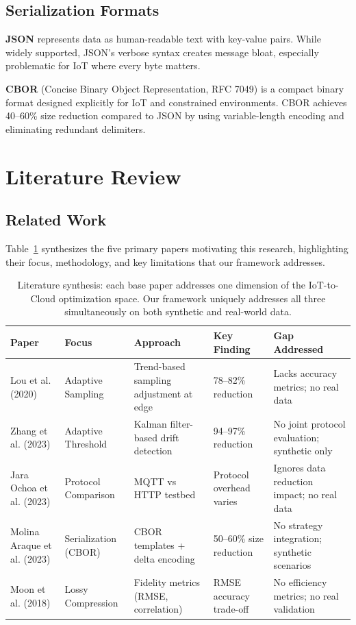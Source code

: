 \documentclass[10pt,twocolumn]{article}
\begin{document}
\subsection{Serialization Formats}

\textbf{JSON} represents data as human-readable text with key-value pairs. While widely supported, JSON's verbose syntax creates message bloat, especially problematic for IoT where every byte matters.

\textbf{CBOR} (Concise Binary Object Representation, RFC 7049) is a compact binary format designed explicitly for IoT and constrained environments. CBOR achieves 40--60\% size reduction compared to JSON by using variable-length encoding and eliminating redundant delimiters.

\section{Literature Review}

\subsection{Related Work}

Table~\ref{tab:litreview} synthesizes the five primary papers motivating this research, highlighting their focus, methodology, and key limitations that our framework addresses.

\begin{table}[t]
\centering
\footnotesize
\begin{tabular}{|p{1.0cm}|p{1.8cm}|p{1.6cm}|p{1.8cm}|p{2.2cm}|}
\hline
\textbf{Paper} & \textbf{Focus} & \textbf{Approach} & \textbf{Key Finding} & \textbf{Gap Addressed} \\
\hline
Lou et al. (2020) & Adaptive Sampling & Trend-based sampling adjustment at edge & 78--82\% reduction & Lacks accuracy metrics; no real data \\
\hline
Zhang et al. (2023) & Adaptive Threshold & Kalman filter-based drift detection & 94--97\% reduction & No joint protocol evaluation; synthetic only \\
\hline
Jara Ochoa et al. (2023) & Protocol Comparison & MQTT vs HTTP testbed & Protocol overhead varies & Ignores data reduction impact; no real data \\
\hline
Molina Araque et al. (2023) & Serialization (CBOR) & CBOR templates + delta encoding & 50--60\% size reduction & No strategy integration; synthetic scenarios \\
\hline
Moon et al. (2018) & Lossy Compression & Fidelity metrics (RMSE, correlation) & RMSE accuracy trade-off & No efficiency metrics; no real validation \\
\hline
\end{tabular}
\caption{Literature synthesis: each base paper addresses one dimension of the IoT-to-Cloud optimization space. Our framework uniquely addresses all three simultaneously on both synthetic and real-world data.}
\label{tab:litreview}
\end{table}
\end{document}
